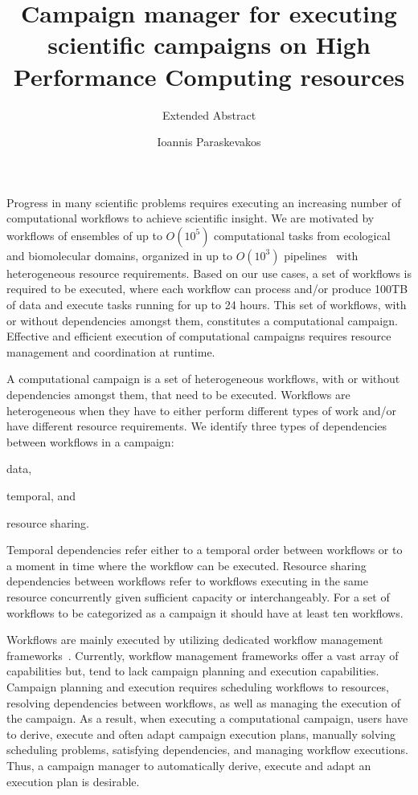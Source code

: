 

\title{Campaign manager for executing scientific campaigns on High Performance 
Computing resources}
\subtitle{Extended Abstract}
\author{Ioannis Paraskevakos}
\vspace{-8ex}
\date{}

\maketitle

Progress in many scientific problems requires executing an increasing number of 
computational workflows to achieve scientific insight. We are motivated by 
workflows of ensembles of up to $O(10^5)$ computational tasks from ecological 
and biomolecular domains, organized in up to $O(10^3)$ 
pipelines~\cite{rietmann2012forward, dakka2018high, paraskevakos2019workflow} 
with heterogeneous resource requirements. Based on our use cases, a set of 
workflows is required to be executed, where each workflow can process and/or 
produce 100TB of data and execute tasks running for up to 24 hours. This set 
of workflows, with or without dependencies amongst them, constitutes a 
computational campaign. Effective and efficient execution of computational 
campaigns requires resource management and coordination at runtime.

A computational campaign is a set of heterogeneous workflows, with or without 
dependencies amongst them, that need to be executed. Workflows are heterogeneous 
when they have to either perform different types of work and/or have different 
resource requirements. We identify three types of dependencies between workflows 
in a campaign:
\begin{inparaenum}[1)]
\item data, 
\item temporal, and 
\item resource sharing.
\end{inparaenum} 
Temporal dependencies refer either to a temporal order between workflows or to 
a moment in time where the workflow can be executed. Resource sharing 
dependencies between workflows refer to workflows executing in the same resource 
concurrently given sufficient capacity or interchangeably. For a set of 
workflows to be categorized as a campaign it should have at least ten workflows.

Workflows are mainly executed by utilizing dedicated workflow management 
frameworks~\cite{balasubramanian2018harnessing,deelman2015pegasus,ludascher2006scientific,rocklin2015dask,airflow}.
Currently, workflow management frameworks offer a vast array of capabilities 
but, tend to lack campaign planning and execution capabilities. Campaign planning 
and execution requires scheduling workflows to resources, resolving dependencies 
between workflows, as well as managing the execution of the campaign. As a result, 
when executing a computational campaign, users have to derive, execute and often 
adapt campaign execution plans, manually solving scheduling problems, satisfying 
dependencies, and managing workflow executions. Thus, a campaign manager to 
automatically derive, execute and adapt an execution plan is desirable.

